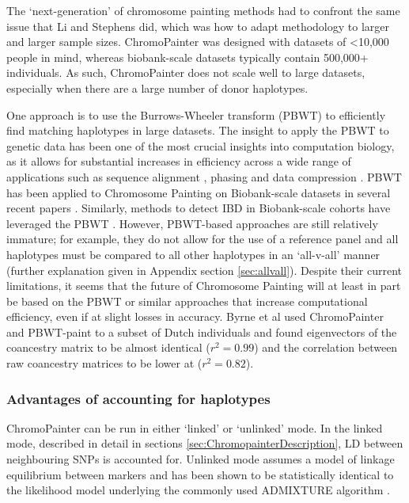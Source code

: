 The `next-generation' of chromosome painting methods had to confront the same issue that Li and Stephens did, which was how to adapt methodology to larger and larger sample sizes. ChromoPainter was designed with datasets of <10,000 people in mind, whereas biobank-scale datasets typically contain 500,000+ individuals. As such, ChromoPainter does not scale well to large datasets, especially when there are a large number of donor haplotypes. 

One approach is to use the Burrows-Wheeler transform (PBWT) \cite{burrows1994block, DurbinPBWT} to efficiently find matching haplotypes in large datasets. The insight to apply the PBWT to genetic data has been one of the most crucial insights into computation biology, as it allows for substantial increases in efficiency across a wide range of applications such as sequence alignment \cite{LiBWA}, phasing \cite{delaneau2018integrative} and data compression \cite{naseri2019multi}. PBWT has been applied to Chromosome Painting on Biobank-scale datasets in several recent papers \cite{byrne2020dutch, saada2020identity}. Similarly, methods to detect IBD in Biobank-scale cohorts have leveraged the PBWT \cite{naseri2019rapid, zhou2020fast}. However, PBWT-based approaches are still relatively immature; for example, they do not allow for the use of a reference panel and all haplotypes must be compared to all other haplotypes in an `all-v-all' manner (further explanation given in Appendix section \ref{sec:allvall}). Despite their current limitations, it seems that the future of Chromosome Painting will at least in part be based on the PBWT or similar approaches that increase computational efficiency, even if at slight losses in accuracy. Byrne et al used ChromoPainter and PBWT-paint to a subset of Dutch individuals and found eigenvectors of the coancestry matrix to be almost identical ($r^2 = 0.99$) and the correlation between raw coancestry matrices to be lower at ($r^2 = 0.82$).

\subsubsection{Advantages of accounting for haplotypes}

ChromoPainter can be run in either `linked' or `unlinked' mode. In the linked mode, described in detail in sections \ref{sec:ChromopainterDescription}, LD between neighbouring SNPs is accounted for. Unlinked mode assumes a model of linkage equilibrium between markers and has been shown to be statistically identical to the likelihood model underlying the commonly used ADMIXTURE algorithm \cite{Lawson2012}.

